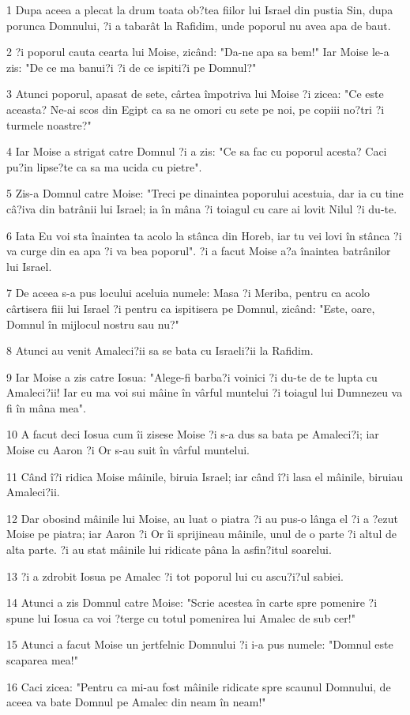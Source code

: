 \par 1 Dupa aceea a plecat la drum toata ob?tea fiilor lui Israel din pustia Sin, dupa porunca Domnului, ?i a tabarât la Rafidim, unde poporul nu avea apa de baut.
\par 2 ?i poporul cauta cearta lui Moise, zicând: "Da-ne apa sa bem!" Iar Moise le-a zis: "De ce ma banui?i ?i de ce ispiti?i pe Domnul?"
\par 3 Atunci poporul, apasat de sete, cârtea împotriva lui Moise ?i zicea: "Ce este aceasta? Ne-ai scos din Egipt ca sa ne omori cu sete pe noi, pe copiii no?tri ?i turmele noastre?"
\par 4 Iar Moise a strigat catre Domnul ?i a zis: "Ce sa fac cu poporul acesta? Caci pu?in lipse?te ca sa ma ucida cu pietre".
\par 5 Zis-a Domnul catre Moise: "Treci pe dinaintea poporului acestuia, dar ia cu tine câ?iva din batrânii lui Israel; ia în mâna ?i toiagul cu care ai lovit Nilul ?i du-te.
\par 6 Iata Eu voi sta înaintea ta acolo la stânca din Horeb, iar tu vei lovi în stânca ?i va curge din ea apa ?i va bea poporul". ?i a facut Moise a?a înaintea batrânilor lui Israel.
\par 7 De aceea s-a pus locului aceluia numele: Masa ?i Meriba, pentru ca acolo cârtisera fiii lui Israel ?i pentru ca ispitisera pe Domnul, zicând: "Este, oare, Domnul în mijlocul nostru sau nu?"
\par 8 Atunci au venit Amaleci?ii sa se bata cu Israeli?ii la Rafidim.
\par 9 Iar Moise a zis catre Iosua: "Alege-fi barba?i voinici ?i du-te de te lupta cu Amaleci?ii! Iar eu ma voi sui mâine în vârful muntelui ?i toiagul lui Dumnezeu va fi în mâna mea".
\par 10 A facut deci Iosua cum îi zisese Moise ?i s-a dus sa bata pe Amaleci?i; iar Moise cu Aaron ?i Or s-au suit în vârful muntelui.
\par 11 Când î?i ridica Moise mâinile, biruia Israel; iar când î?i lasa el mâinile, biruiau Amaleci?ii.
\par 12 Dar obosind mâinile lui Moise, au luat o piatra ?i au pus-o lânga el ?i a ?ezut Moise pe piatra; iar Aaron ?i Or îi sprijineau mâinile, unul de o parte ?i altul de alta parte. ?i au stat mâinile lui ridicate pâna la asfin?itul soarelui.
\par 13 ?i a zdrobit Iosua pe Amalec ?i tot poporul lui cu ascu?i?ul sabiei.
\par 14 Atunci a zis Domnul catre Moise: "Scrie acestea în carte spre pomenire ?i spune lui Iosua ca voi ?terge cu totul pomenirea lui Amalec de sub cer!"
\par 15 Atunci a facut Moise un jertfelnic Domnului ?i i-a pus numele: "Domnul este scaparea mea!"
\par 16 Caci zicea: "Pentru ca mi-au fost mâinile ridicate spre scaunul Domnului, de aceea va bate Domnul pe Amalec din neam în neam!"

